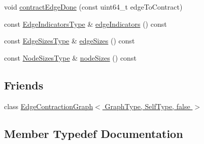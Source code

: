 \begin{DoxyCompactItemize}
void \hyperlink{classnifty_1_1graph_1_1agglo_1_1MinimumNodeSizeClusterPolicy_a112ebb5f7a1505f53fcc973e6139fff4}{contract\+Edge\+Done} (const uint64\+\_\+t edge\+To\+Contract)
\item 
const \hyperlink{classnifty_1_1graph_1_1agglo_1_1MinimumNodeSizeClusterPolicy_a81a0b54e4eadb98c9a125593b1c6e17c}{Edge\+Indicators\+Type} \& \hyperlink{classnifty_1_1graph_1_1agglo_1_1MinimumNodeSizeClusterPolicy_ae835d9c430941e545000c4bd62a2d9c9}{edge\+Indicators} () const 
\item 
const \hyperlink{classnifty_1_1graph_1_1agglo_1_1MinimumNodeSizeClusterPolicy_a645ba7b5aabb0fd8cecad292041d929a}{Edge\+Sizes\+Type} \& \hyperlink{classnifty_1_1graph_1_1agglo_1_1MinimumNodeSizeClusterPolicy_acb139cba94b7e5f8b399f7530c4b85af}{edge\+Sizes} () const 
\item 
const \hyperlink{classnifty_1_1graph_1_1agglo_1_1MinimumNodeSizeClusterPolicy_a64f036ec68ecf74d84f9238f77957c1e}{Node\+Sizes\+Type} \& \hyperlink{classnifty_1_1graph_1_1agglo_1_1MinimumNodeSizeClusterPolicy_af9fd3c2ce6bcd15957fee992f043d665}{node\+Sizes} () const 
\end{DoxyCompactItemize}
\subsection*{Friends}
\begin{DoxyCompactItemize}
\item 
class \hyperlink{classnifty_1_1graph_1_1agglo_1_1MinimumNodeSizeClusterPolicy_aca0e7e94ea239b3e26ea0173e356de7a}{Edge\+Contraction\+Graph$<$ Graph\+Type, Self\+Type, false $>$}
\end{DoxyCompactItemize}


\subsection{Member Typedef Documentation}
\hypertarget{classnifty_1_1graph_1_1agglo_1_1MinimumNodeSizeClusterPolicy_a5c67401c61d1d283b73c3ce8a31faeb9}{}
